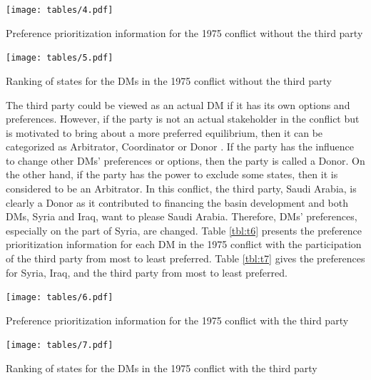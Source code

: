 \documentclass[letterpaper,12pt,titlepage,oneside,final]{book}
\begin{document}
\begin{table}[H]
\centering
\texttt{[image: tables/4.pdf]}

\caption{Preference prioritization information for the 1975 conflict without the third party}

\label{tbl:t4}
\end{table}


\begin{table}[H]
\centering
\texttt{[image: tables/5.pdf]}

\caption{Ranking of states for the DMs in the 1975 conflict without the third party}

\label{tbl:t5}
\end{table}

The third party could be viewed as an actual DM if it has its own options and preferences. However, if the party is not an actual stakeholder in the conflict but is motivated to bring about a more preferred equilibrium, then it can be categorized as Arbitrator, Coordinator or Donor \citep{sakamoto2005}. If the party has the influence to change other DMs' preferences or options, then the party is called a Donor. On the other hand, if the party has the power to exclude some states, then it is considered to be an Arbitrator. In this conflict, the third party, Saudi Arabia, is clearly a Donor as it contributed to financing the basin development and both DMs, Syria and Iraq, want to please Saudi Arabia. Therefore, DMs' preferences, especially on the part of Syria, are changed. Table \ref{tbl:t6} presents the preference prioritization information for each DM in the 1975 conflict with the participation of the third party from most to least preferred. Table \ref{tbl:t7} gives the preferences for Syria, Iraq, and the third party from most to least preferred.

\begin{table}[H]
\centering
\texttt{[image: tables/6.pdf]}

\caption{Preference prioritization information for the 1975 conflict with the third party}

\label{tbl:t6}
\end{table}

\begin{table}[H]
\centering
\texttt{[image: tables/7.pdf]}

\caption{Ranking of states for the DMs in the 1975 conflict with the third party}

\label{tbl:t7}
\end{table}
\end{document}
